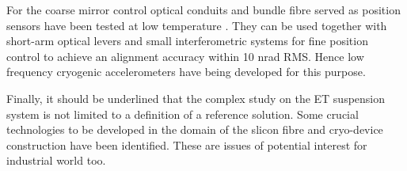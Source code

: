 \noindent
For the  coarse mirror control optical conduits and bundle fibre served as position sensors have been tested  at low temperature  \cite{VFC}. They can be used together with short-arm optical levers and small 
interferometric systems for fine position control to achieve an alignment accuracy within 
10 nrad RMS. Hence low frequency cryogenic accelerometers have being developed 
for this purpose.

\medskip

Finally, it should be underlined that the complex study on the ET suspension system 
is not limited to a definition of a reference solution. Some crucial technologies 
to be developed in the domain of the slicon fibre and cryo-device construction have
been identified. These are issues of potential interest for industrial world too.


 
